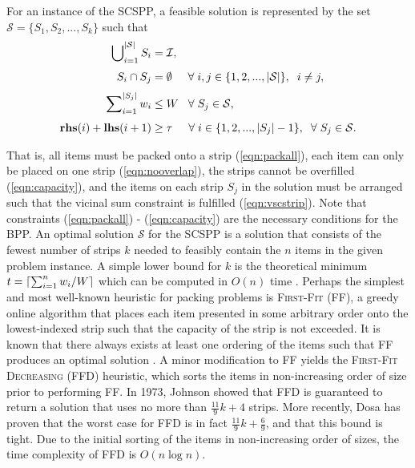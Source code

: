 \documentclass[runningheads]{llncs}
\begin{document}
For an instance of the SCSPP, a feasible solution is represented by the set $\mathcal{S} = \{S_1, S_2, ..., S_k\}$ such that
\begin{subequations}
	\begin{align}
		\bigcup\nolimits_{i=1}^{|\mathcal{S}|} S_i &= \mathcal{I}, \label{eqn:packall}\\[3pt]
		S_i \cap S_j &= \emptyset \hspace{5mm} \forall \hspace{1mm} i, j \in \{1, 2, ..., |\mathcal{S}|\}, \hspace{2mm} i \neq j, \label{eqn:nooverlap} \\[3pt]
		\sum\nolimits_{i=1}^{|S_j|}w_i & \leq W \hspace{3mm} \forall \hspace{1mm} S_j \in \mathcal{S}, \label{eqn:capacity} \\[3pt]
		\textup{\textbf{rhs}}(i) + \textup{\textbf{lhs}}(i+1) &\geq \tau \hspace {5mm} \forall \hspace{1mm} i \in \{1, 2, ..., |S_j|-1\}, \hspace{2mm} \forall \hspace{1mm} S_j \in \mathcal{S}. \label{eqn:vscstrip}
\end{align}
\end{subequations}

That is, all items must be packed onto a strip (\ref{eqn:packall}), each item can only be placed on one strip (\ref{eqn:nooverlap}), the strips cannot be overfilled (\ref{eqn:capacity}), and the items on each strip $S_j$ in the solution must be arranged such that the vicinal sum constraint is fulfilled (\ref{eqn:vscstrip}). Note that constraints (\ref{eqn:packall}) - (\ref{eqn:capacity}) are the necessary conditions for the BPP. An optimal solution $\mathcal{S}$ for the SCSPP is a solution that consists of the fewest number of strips $k$ needed to feasibly contain the $n$ items in the given problem instance. A simple lower bound for $k$ is the theoretical minimum
$t = \ceil*{\sum_{i=1}^{n}w_i / W}$ which can be computed in $O(n)$ time \cite{martello1990b}. Perhaps the simplest and most well-known heuristic for packing problems is \textsc{First-Fit} (FF), a greedy online algorithm that places each item presented in some arbitrary order onto the lowest-indexed strip such that the capacity of the strip is not exceeded. It is known that there always exists at least one ordering of the items such that FF produces an optimal solution \cite{lewis2009}. A minor modification to FF yields the \textsc{First-Fit Decreasing} (FFD) heuristic, which sorts the items in non-increasing order of size prior to performing FF. In 1973, Johnson \cite{johnson1973} showed that FFD is guaranteed to return a solution that uses no more than $\frac{11}{9}k + 4$ strips. More recently, Dosa \cite{dosa2007} has proven that the worst case for FFD is in fact $\frac{11}{9}k + \frac{6}{9}$, and that this bound is tight. Due to the initial sorting of the items in non-increasing order of sizes, the time complexity of FFD is $O(n\log n)$.
\end{document}
